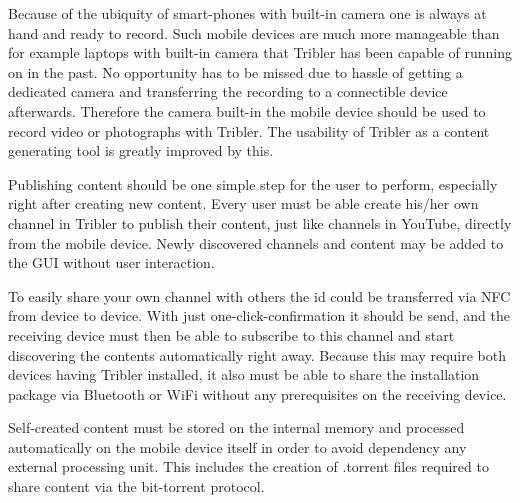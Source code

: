 Because of the ubiquity of smart-phones with built-in camera one is always at hand and ready to record.
Such mobile devices are much more manageable than for example laptops with built-in camera that Tribler has been capable of running on in the past.
No opportunity has to be missed due to hassle of getting a dedicated camera and transferring the recording to a connectible device afterwards.
Therefore the camera built-in the mobile device should be used to record video or photographs with Tribler.
The usability of Tribler as a content generating tool is greatly improved by this. 

Publishing content should be one simple step for the user to perform, especially right after creating new content.
Every user must be able create his/her own channel in Tribler to publish their content, just like channels in YouTube, directly from the mobile device.
Newly discovered channels and content may be added to the GUI without user interaction.

To easily share your own channel with others the id could be transferred via NFC from device to device.
With just one-click-confirmation it should be send, and the receiving device must then be able to subscribe to this channel and start discovering the contents automatically right away.
Because this may require both devices having Tribler installed, it also must be able to share the installation package via Bluetooth or WiFi without any prerequisites on the receiving device.

Self-created content must be stored on the internal memory and processed automatically on the mobile device itself in order to avoid dependency any external processing unit.
This includes the creation of .torrent files required to share content via the bit-torrent protocol.

